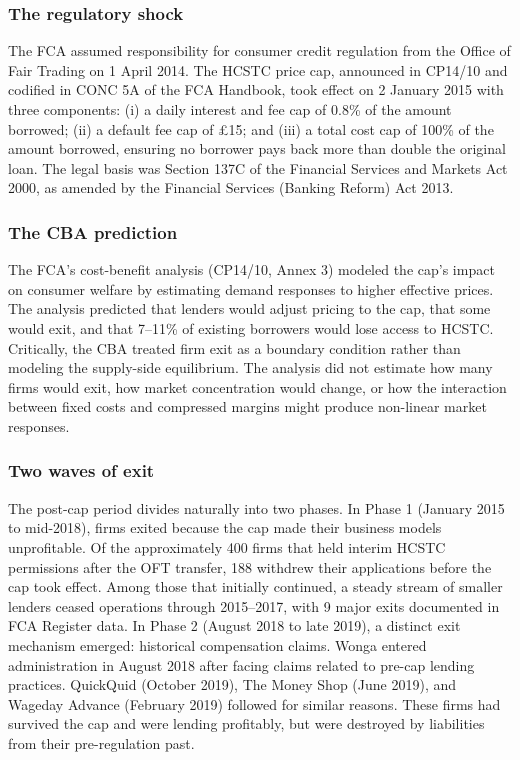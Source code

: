 \documentclass[12pt]{article}
\begin{document}
\subsubsection*{The regulatory shock} The FCA assumed responsibility for consumer credit regulation from the Office of Fair Trading on 1 April 2014. The HCSTC price cap, announced in CP14/10 and codified in CONC 5A of the FCA Handbook, took effect on 2 January 2015 with three components: (i) a daily interest and fee cap of 0.8\% of the amount borrowed; (ii) a default fee cap of \pounds15; and (iii) a total cost cap of 100\% of the amount borrowed, ensuring no borrower pays back more than double the original loan. The legal basis was Section 137C of the Financial Services and Markets Act 2000, as amended by the Financial Services (Banking Reform) Act 2013.

\subsubsection*{The CBA prediction} The FCA's cost-benefit analysis (CP14/10, Annex 3) modeled the cap's impact on consumer welfare by estimating demand responses to higher effective prices. The analysis predicted that lenders would adjust pricing to the cap, that some would exit, and that 7--11\% of existing borrowers would lose access to HCSTC. Critically, the CBA treated firm exit as a boundary condition rather than modeling the supply-side equilibrium. The analysis did not estimate how many firms would exit, how market concentration would change, or how the interaction between fixed costs and compressed margins might produce non-linear market responses.

\subsubsection*{Two waves of exit} The post-cap period divides naturally into two phases. In Phase 1 (January 2015 to mid-2018), firms exited because the cap made their business models unprofitable. Of the approximately 400 firms that held interim HCSTC permissions after the OFT transfer, 188 withdrew their applications before the cap took effect. Among those that initially continued, a steady stream of smaller lenders ceased operations through 2015--2017, with 9 major exits documented in FCA Register data. In Phase 2 (August 2018 to late 2019), a distinct exit mechanism emerged: historical compensation claims. Wonga entered administration in August 2018 after facing claims related to pre-cap lending practices. QuickQuid (October 2019), The Money Shop (June 2019), and Wageday Advance (February 2019) followed for similar reasons. These firms had survived the cap and were lending profitably, but were destroyed by liabilities from their pre-regulation past.
\end{document}
